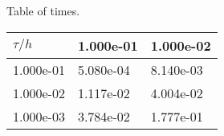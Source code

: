 \begin{center}
Table of times.
  
\begin{tabular}{|p{1in}|p{1in}|p{1in}|} \hline
$\tau / h$ &1.000e-01 &1.000e-02 \\ \hline 
1.000e-01 &5.080e-04 &8.140e-03 \\ \hline 
1.000e-02 &1.117e-02 &4.004e-02 \\ \hline 
1.000e-03 &3.784e-02 &1.777e-01 \\ \hline 

\end{tabular}\\[20pt]
\end{center}
